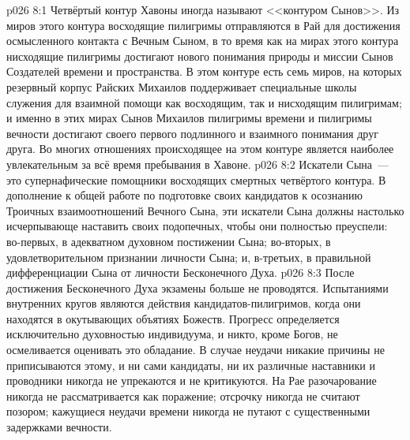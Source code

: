 \vs p026 8:1 Четвёртый контур Хавоны иногда называют <<контуром Сынов>>. Из миров этого контура восходящие пилигримы отправляются в Рай для достижения осмысленного контакта с Вечным Сыном, в то время как на мирах этого контура нисходящие пилигримы достигают нового понимания природы и миссии Сынов Создателей времени и пространства. В этом контуре есть семь миров, на которых резервный корпус Райских Михаилов поддерживает специальные школы служения для взаимной помощи как восходящим, так и нисходящим пилигримам; и именно в этих мирах Сынов Михаилов пилигримы времени и пилигримы вечности достигают своего первого подлинного и взаимного понимания друг друга. Во многих отношениях происходящее на этом контуре является наиболее увлекательным за всё время пребывания в Хавоне.
\vs p026 8:2 Искатели Сына~--- это супернафические помощники восходящих смертных четвёртого контура. В дополнение к общей работе по подготовке своих кандидатов к осознанию Троичных взаимоотношений Вечного Сына, эти искатели Сына должны настолько исчерпывающе наставить своих подопечных, чтобы они полностью преуспели: во\hyp{}первых, в адекватном духовном постижении Сына; во\hyp{}вторых, в удовлетворительном признании личности Сына; и, в\hyp{}третьих, в правильной дифференциации Сына от личности Бесконечного Духа.
\vs p026 8:3 После достижения Бесконечного Духа экзамены больше не проводятся. Испытаниями внутренних кругов являются действия кандидатов\hyp{}пилигримов, когда они находятся в окутывающих объятиях Божеств. Прогресс определяется исключительно духовностью индивидуума, и никто, кроме Богов, не осмеливается оценивать это обладание. В случае неудачи никакие причины не приписываются этому, и ни сами кандидаты, ни их различные наставники и проводники никогда не упрекаются и не критикуются. На Рае разочарование никогда не рассматривается как поражение; отсрочку никогда не считают позором; кажущиеся неудачи времени никогда не путают с существенными задержками вечности.
